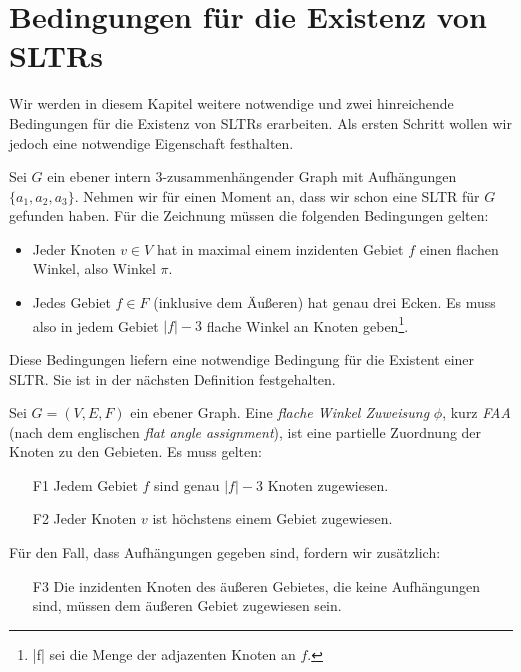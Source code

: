 \chapter{Bedingungen für die Existenz von SLTRs}\label{main_theory}

Wir werden in diesem Kapitel weitere notwendige und zwei hinreichende Bedingungen für die Existenz von SLTRs erarbeiten. Als ersten Schritt wollen wir jedoch eine notwendige Eigenschaft festhalten.

Sei $G$ ein ebener intern 3-zusammenhängender Graph mit Aufhängungen $\{a_1,a_2,a_3\}$. Nehmen wir für einen Moment an, dass wir schon eine SLTR für $G$ gefunden haben. Für die Zeichnung müssen die folgenden Bedingungen gelten:

\begin{itemize}
\item Jeder Knoten $v \in V$ hat in maximal einem inzidenten Gebiet $f$ einen flachen Winkel, also Winkel $\pi$.
\item Jedes Gebiet $f \in F$ (inklusive dem Äußeren) hat genau drei Ecken. Es muss also in jedem Gebiet $|f|-3$ flache Winkel an Knoten geben\footnote{|f| sei die Menge der adjazenten Knoten an $f$.}.
\end{itemize}

Diese Bedingungen liefern eine notwendige Bedingung für die Existent einer SLTR. Sie ist in der nächsten Definition festgehalten.

\begin{definition}[FAA]\label{def_faa}
Sei $G=(V,E,F)$ ein ebener Graph. Eine \textit{flache Winkel Zuweisung} $\phi$, kurz \textit{FAA} (nach dem englischen \textit{flat angle assignment}), ist eine partielle Zuordnung der Knoten zu den Gebieten. Es muss gelten:
\begin{itemize}
\item [F1] Jedem Gebiet $f$ sind genau $|f|-3$ Knoten zugewiesen.
\item [F2] Jeder Knoten $v$ ist höchstens einem Gebiet zugewiesen.
\end{itemize}
Für den Fall, dass Aufhängungen gegeben sind, fordern wir zusätzlich:
\begin{itemize}
\item [F3] Die inzidenten Knoten des äußeren Gebietes, die keine Aufhängungen sind, müssen dem äußeren Gebiet zugewiesen sein.
\end{itemize}

\end{definition}

